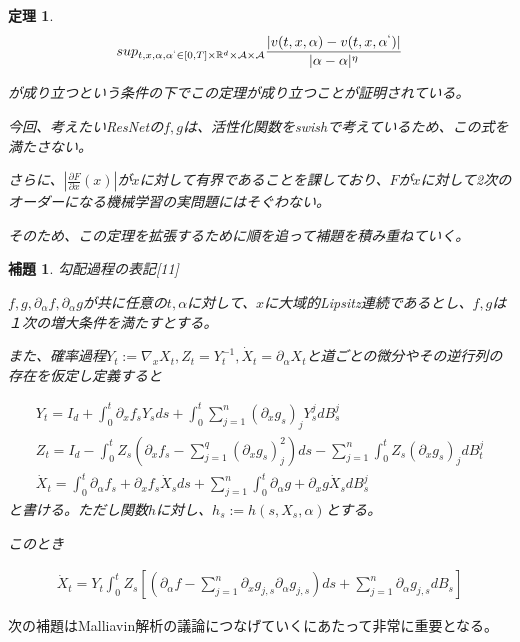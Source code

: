 \documentclass{jsarticle}
\newtheorem{theo}{定理}[section]
\newtheorem{ho}{補題}[section]
\begin{document}
\begin{theo}
\begin{align}
sup_{t,x,\alpha,\alpha^`\in [0,T]\times \mathbb{R}^d\times \mathcal{A}\times\mathcal{A}} \frac{|v(t,x,\alpha)-v(t,x,\alpha^`)|}{|\alpha-\alpha|^\eta}
\end{align}

が成り立つという条件の下でこの定理が成り立つことが証明されている。



今回、考えたいResNetの$f,g$は、活性化関数をswishで考えているため、この式を満たさない。

さらに、$|\frac{\partial F}{\partial x}(x)|$が$x$に対して有界であることを課しており、$F$が$x$に対して2次のオーダーになる機械学習の実問題にはそぐわない。

そのため、この定理を拡張するために順を追って補題を積み重ねていく。


\end{theo}


\begin{ho} 勾配過程の表記[11] 

$f,g,\partial_\alpha f,\partial_\alpha g$が共に任意の$t,\alpha$に対して、$x$に大域的Lipsitz連続であるとし、$f,g$は１次の増大条件を満たすとする。

また、確率過程$Y_t:=\nabla_x X_t,Z_t=Y_t^{-1},\dot{X}_t=\partial_\alpha X_t$と道ごとの微分やその逆行列の存在を仮定し定義すると

\begin{align}
Y_t=I_d+\int^t_0 \partial_x f_s Y_s ds+\int^t_0 \sum^n_{j=1} (\partial_x g_s)_{j} Y^j_s dB^j_s\\
Z_t=I_d-\int^t_0 Z_s(\partial_x f_s-\sum^q_{j=1}(\partial_x g_s)^2_j )ds-\sum^n_{j=1}\int^t_0 Z_s (\partial_x g_s)_jdB^j_t \\
\dot{X}_t= \int^t_0 \partial_\alpha f_s+ \partial_x f_s \dot{X}_sds+\sum^n_{j=1}\int^t_0 \partial_\alpha g+ \partial_x g\dot{X}_sdB^j_s
\end{align}
と書ける。ただし関数$h$に対し、$h_s:=h(s,X_s,\alpha)$とする。


このとき

\begin{align}
\dot{X}_t=Y_t\int^t_0 Z_s[(\partial_\alpha f-\sum^n_{j=1}\partial_x g_{j,s}\partial_\alpha g_{j,s})ds+\sum^n_{j=1} \partial_\alpha g_{j,s}dB_s]
\end{align}

\end{ho}

次の補題はMalliavin解析の議論につなげていくにあたって非常に重要となる。
\end{document}
